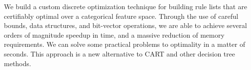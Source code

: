 We build a custom discrete optimization technique for building rule lists that
are certifiably optimal over a categorical feature space.
%
Through the use of careful bounds, data structures, and bit-vector operations,
we are able to achieve several orders of magnitude speedup in time,
and a massive reduction of memory requirements.
%
We can solve some practical problems to optimality in a matter of seconds.
%
This approach is a new alternative to CART and other decision tree methods.
